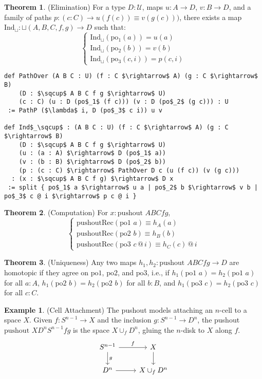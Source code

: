 \documentclass{article}
\theoremstyle{definition}
\newtheorem{theorem}{Theorem}
\newtheorem{example}{Example}
\begin{document}
\begin{theorem} (Elimination)
For a type $D : \mathcal{U}$, maps $u : A \to D$, $v : B \to D$,
and a family of paths $p : (c : C) \to u(f(c)) \equiv v(g(c)))$,
there exists a map $\text{Ind}_\sqcup : \sqcup(A,B,C,f,g) \to D$ such that:
\[
\begin{cases}
\text{Ind}_\sqcup(\text{po$_1$}(a)) = u(a) \\
\text{Ind}_\sqcup(\text{po$_2$}(b)) = v(b) \\
\text{Ind}_\sqcup(\text{po$_3$}(c,i)) = p(c,i)
\end{cases}
\]
\begin{lstlisting}[mathescape=true]
def PathOver (A B C : U) (f : C $\rightarrow$ A) (g : C $\rightarrow$ B)
    (D : $\sqcup$ A B C f g $\rightarrow$ U)
    (c : C) (u : D (po$_1$ (f c))) (v : D (po$_2$ (g c))) : U
 := PathP ($\lambda$ i, D (po$_3$ c i)) u v

def Ind$_\sqcup$ : (A B C : U) (f : C $\rightarrow$ A) (g : C $\rightarrow$ B)
    (D : $\sqcup$ A B C f g $\rightarrow$ U)
    (u : (a : A) $\rightarrow$ D (po$_1$ a))
    (v : (b : B) $\rightarrow$ D (po$_2$ b))
    (p : (c : C) $\rightarrow$ PathOver D c (u (f c)) (v (g c)))
  : (x : $\sqcup$ A B C f g) $\rightarrow$ D x
 := split { po$_1$ a $\rightarrow$ u a | po$_2$ b $\rightarrow$ v b | po$_3$ c @ i $\rightarrow$ p c @ i }
\end{lstlisting}
\end{theorem}

\newpage
\begin{theorem} (Computation)
For $x : \text{pushout } A B C f g$,
\[
\begin{cases}
\text{pushoutRec}(\text{po1 } a) \equiv h_A(a) \\
\text{pushoutRec}(\text{po2 } b) \equiv h_B(b) \\
\text{pushoutRec}(\text{po3 } c \, @ \, i) \equiv h_C(c) \, @ \, i
\end{cases}
\]
\end{theorem}

\begin{theorem} (Uniqueness)
Any two maps $h_1, h_2 : \text{pushout } A B C f g \to D$ are homotopic
if they agree on $\text{po1}$, $\text{po2}$, and $\text{po3}$, i.e.,
if $h_1(\text{po1 } a) = h_2(\text{po1 } a)$ for all $a : A$, $h_1(\text{po2 } b) = h_2(\text{po2 } b)$
for all $b : B$, and $h_1(\text{po3 } c) = h_2(\text{po3 } c)$ for all $c : C$.
\end{theorem}

\begin{example} (Cell Attachment)
The pushout models attaching an $n$-cell to a space $X$.
Given $f : S^{n-1} \to X$ and the inclusion $g : S^{n-1} \to D^n$,
the pushout $\text{pushout } X D^n S^{n-1} f g$ is the
space $X \cup_f D^n$, gluing the $n$-disk to $X$ along $f$.
\[
\begin{tikzcd}
S^{n-1} \arrow[r, "f"] \arrow[d, "g"] & X \arrow[d] \\
D^n \arrow[r] & X \cup_f D^n
\end{tikzcd}
\]
\end{example}
\end{document}
